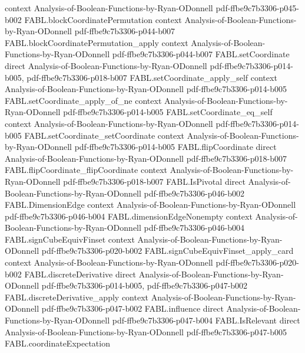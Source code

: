 \begin{theorem}
  {context}
  {Analysis-of-Boolean-Functions-by-Ryan-ODonnell}
  {pdf-ffbe9c7b3306-p045-b002}
\proofstep
  {FABL.blockCoordinatePermutation}
  {context}
  {Analysis-of-Boolean-Functions-by-Ryan-ODonnell}
  {pdf-ffbe9c7b3306-p044-b007}
\proofstep
  {FABL.blockCoordinatePermutation_apply}
  {context}
  {Analysis-of-Boolean-Functions-by-Ryan-ODonnell}
  {pdf-ffbe9c7b3306-p044-b007}
\proofstep
  {FABL.setCoordinate}
  {direct}
  {Analysis-of-Boolean-Functions-by-Ryan-ODonnell}
  {pdf-ffbe9c7b3306-p014-b005,
    pdf-ffbe9c7b3306-p018-b007}
\proofstep
  {FABL.setCoordinate_apply_self}
  {context}
  {Analysis-of-Boolean-Functions-by-Ryan-ODonnell}
  {pdf-ffbe9c7b3306-p014-b005}
\proofstep
  {FABL.setCoordinate_apply_of_ne}
  {context}
  {Analysis-of-Boolean-Functions-by-Ryan-ODonnell}
  {pdf-ffbe9c7b3306-p014-b005}
\proofstep
  {FABL.setCoordinate_eq_self}
  {context}
  {Analysis-of-Boolean-Functions-by-Ryan-ODonnell}
  {pdf-ffbe9c7b3306-p014-b005}
\proofstep
  {FABL.setCoordinate_setCoordinate}
  {context}
  {Analysis-of-Boolean-Functions-by-Ryan-ODonnell}
  {pdf-ffbe9c7b3306-p014-b005}
\proofstep
  {FABL.flipCoordinate}
  {direct}
  {Analysis-of-Boolean-Functions-by-Ryan-ODonnell}
  {pdf-ffbe9c7b3306-p018-b007}
\proofstep
  {FABL.flipCoordinate_flipCoordinate}
  {context}
  {Analysis-of-Boolean-Functions-by-Ryan-ODonnell}
  {pdf-ffbe9c7b3306-p018-b007}
\proofstep
  {FABL.IsPivotal}
  {direct}
  {Analysis-of-Boolean-Functions-by-Ryan-ODonnell}
  {pdf-ffbe9c7b3306-p046-b002}
\proofstep
  {FABL.DimensionEdge}
  {context}
  {Analysis-of-Boolean-Functions-by-Ryan-ODonnell}
  {pdf-ffbe9c7b3306-p046-b004}
\proofstep
  {FABL.dimensionEdgeNonempty}
  {context}
  {Analysis-of-Boolean-Functions-by-Ryan-ODonnell}
  {pdf-ffbe9c7b3306-p046-b004}
\proofstep
  {FABL.signCubeEquivFinset}
  {context}
  {Analysis-of-Boolean-Functions-by-Ryan-ODonnell}
  {pdf-ffbe9c7b3306-p020-b002}
\proofstep
  {FABL.signCubeEquivFinset_apply_card}
  {context}
  {Analysis-of-Boolean-Functions-by-Ryan-ODonnell}
  {pdf-ffbe9c7b3306-p020-b002}
\proofstep
  {FABL.discreteDerivative}
  {direct}
  {Analysis-of-Boolean-Functions-by-Ryan-ODonnell}
  {pdf-ffbe9c7b3306-p014-b005,
    pdf-ffbe9c7b3306-p047-b002}
\proofstep
  {FABL.discreteDerivative_apply}
  {context}
  {Analysis-of-Boolean-Functions-by-Ryan-ODonnell}
  {pdf-ffbe9c7b3306-p047-b002}
\proofstep
  {FABL.influence}
  {direct}
  {Analysis-of-Boolean-Functions-by-Ryan-ODonnell}
  {pdf-ffbe9c7b3306-p047-b004}
\proofstep
  {FABL.IsRelevant}
  {direct}
  {Analysis-of-Boolean-Functions-by-Ryan-ODonnell}
  {pdf-ffbe9c7b3306-p047-b005}
\proofstep
  {FABL.coordinateExpectation}

\end{theorem}
